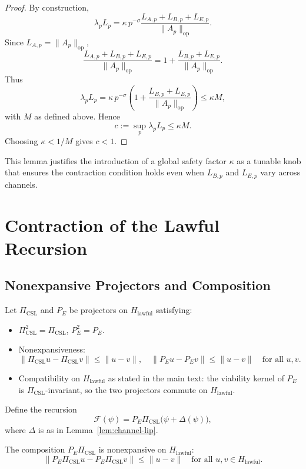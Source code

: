 \documentclass[11pt]{article}
\begin{document}
\begin{proof}
By construction,
\[
  \lambda_p L_p = \kappa\, p^{-\sigma} \frac{L_{A,p} + L_{B,p} + L_{E,p}}{\|A_p\|_{\mathrm{op}}}.
\]
Since $L_{A,p} = \|A_p\|_{\mathrm{op}}$,
\[
  \frac{L_{A,p} + L_{B,p} + L_{E,p}}{\|A_p\|_{\mathrm{op}}}
  = 1 + \frac{L_{B,p} + L_{E,p}}{\|A_p\|_{\mathrm{op}}}.
\]
Thus
\[
  \lambda_p L_p
  = \kappa\, p^{-\sigma} \left( 1 + \frac{L_{B,p} + L_{E,p}}{\|A_p\|_{\mathrm{op}}} \right)
  \le \kappa M,
\]
with $M$ as defined above.
Hence
\[
  c := \sup_p \lambda_p L_p \le \kappa M.
\]
Choosing $\kappa < 1/M$ gives $c < 1$.
\end{proof}

This lemma justifies the introduction of a global safety factor $\kappa$ as a tunable knob that ensures the contraction condition holds even when $L_{B,p}$ and $L_{E,p}$ vary across channels.

\section{Contraction of the Lawful Recursion}

\subsection{Nonexpansive Projectors and Composition}

Let $\Pi_{\text{CSL}}$ and $P_E$ be projectors on $H_{\text{lawful}}$ satisfying:
\begin{itemize}[leftmargin=1.5em]
  \item $\Pi_{\text{CSL}}^2 = \Pi_{\text{CSL}}$, $P_E^2 = P_E$.
  \item Nonexpansiveness:
  \[
    \|\Pi_{\text{CSL}} u - \Pi_{\text{CSL}} v\| \le \|u - v\|,
    \quad
    \|P_E u - P_E v\| \le \|u - v\|
    \quad\text{for all } u,v.
  \]
  \item Compatibility on $H_{\text{lawful}}$ as stated in the main text: the viability kernel of $P_E$ is $\Pi_{\text{CSL}}$-invariant, so the two projectors commute on $H_{\text{lawful}}$.
\end{itemize}

Define the recursion
\begin{equation}
  \mathcal{F}(\psi) = P_E \Pi_{\text{CSL}} \bigl( \psi + \Delta(\psi) \bigr),
\end{equation}
where $\Delta$ is as in Lemma~\ref{lem:channel-lip}.

\begin{lemma}
\label{lem:proj-nonexp}
The composition $P_E \Pi_{\text{CSL}}$ is nonexpansive on $H_{\text{lawful}}$:
\begin{equation}
  \|P_E \Pi_{\text{CSL}} u - P_E \Pi_{\text{CSL}} v\|
  \le \|u - v\|
  \quad\text{for all } u,v \in H_{\text{lawful}}.
\end{equation}
\end{lemma}
\end{document}
